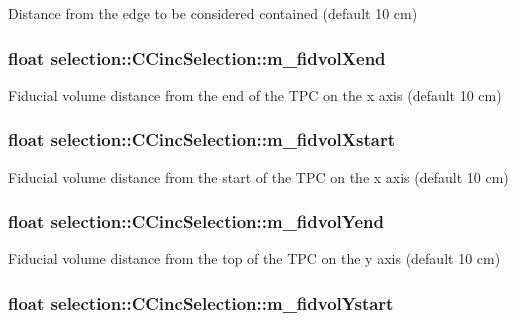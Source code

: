 Distance from the edge to be considered contained (default 10 cm) \hypertarget{classselection_1_1CCincSelection_ae4bab4cf8ea55e54fcdaa66d2fe44c1d}{
\subsubsection[{m\-\_\-fidvol\-Xend}]{\setlength{\rightskip}{0pt plus 5cm}float selection\-::\-C\-Cinc\-Selection\-::m\-\_\-fidvol\-Xend\hspace{0.3cm}{\ttfamily [private]}}}\label{classselection_1_1CCincSelection_ae4bab4cf8ea55e54fcdaa66d2fe44c1d}
Fiducial volume distance from the end of the T\-P\-C on the x axis (default 10 cm) \hypertarget{classselection_1_1CCincSelection_aab38faac4866d19339aadbc3ac1eb55b}{
\subsubsection[{m\-\_\-fidvol\-Xstart}]{\setlength{\rightskip}{0pt plus 5cm}float selection\-::\-C\-Cinc\-Selection\-::m\-\_\-fidvol\-Xstart\hspace{0.3cm}{\ttfamily [private]}}}\label{classselection_1_1CCincSelection_aab38faac4866d19339aadbc3ac1eb55b}
Fiducial volume distance from the start of the T\-P\-C on the x axis (default 10 cm) \hypertarget{classselection_1_1CCincSelection_a01d6a0608356e4ea245f23e1b6934fd3}{
\subsubsection[{m\-\_\-fidvol\-Yend}]{\setlength{\rightskip}{0pt plus 5cm}float selection\-::\-C\-Cinc\-Selection\-::m\-\_\-fidvol\-Yend\hspace{0.3cm}{\ttfamily [private]}}}\label{classselection_1_1CCincSelection_a01d6a0608356e4ea245f23e1b6934fd3}
Fiducial volume distance from the top of the T\-P\-C on the y axis (default 10 cm) \hypertarget{classselection_1_1CCincSelection_a28900415eda1eb30d6263081e943e6a5}{
\subsubsection[{m\-\_\-fidvol\-Ystart}]{\setlength{\rightskip}{0pt plus 5cm}float selection\-::\-C\-Cinc\-Selection\-::m\-\_\-fidvol\-Ystart\hspace{0.3cm}{\ttfamily [private]}}}\label{classselection_1_1CCincSelection_a28900415eda1eb30d6263081e943e6a5}
